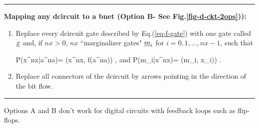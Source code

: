 \hrule\noindent
{\bf Mapping any
dcircuit to a bnet (Option B-
See Fig.\ref{fig-d-ckt-2ops})):}
\begin{enumerate}
\item
Replace every dcircuit  gate 
described by Eq.(\ref{eq-f-gate})
with
one gate called ${\underline{x}}$
and, if $nx>0$, 
$nx$ ``marginalizer gates" ${\underline{m}}_i$
for $i=0, 1, \ldots, nx-1$, such that

\beq\color{blue}
P(x^{nx}|a^{na})=
\delta(x^{nx}, f(a^{na}))
\;,
\eeq
and
\beq\color{blue}
P(m_i|x^{nx})=
\delta(m_i, x_i))
\;.
\eeq


\item
Replace
all connectors of the dcircuit
by arrows 
pointing in the direction
of the bit flow.



\end{enumerate}
\hrule 
Options A and B don't work
for digital circuits 
with feedback loops 
such as flip-flops.